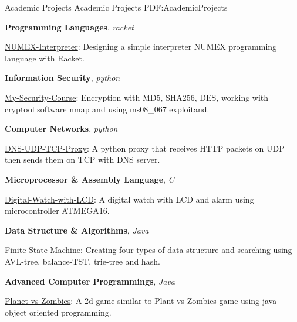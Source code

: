 \documentclass[letterpaper,MMMyyyy,nonstopmode]{resume}
\begin{document}
\begin{Body}


\Section
{Academic Projects}
{Academic Projects}
{PDF:AcademicProjects}

\BigGap
\BulletItem
\textbf{Programming Languages},
\textit{\small{racket}}
\begin{Detail}
\SubBulletItem
\href{https://github.com/aliyazdi75/NUMEX-Interpreter}
{NUMEX-Interpreter}:
Designing a simple interpreter
NUMEX programming language with Racket.
\end{Detail}

\BigGap
\BulletItem
\textbf{Information Security},
\textit{\small{python}}
\begin{Detail}
\SubBulletItem
\href{https://github.com/aliyazdi75/My-Security-Course}
{My-Security-Course}:
Encryption with MD5, SHA256, DES,
working with cryptool software nmap
and using ms08\_067 exploitand.
\end{Detail}

\BigGap
\BulletItem
\textbf{Computer Networks},
\textit{\small{python}}
\begin{Detail}
\SubBulletItem
\href{https://github.com/aliyazdi75/DNS-UDP-TCP-Proxy}
{DNS-UDP-TCP-Proxy}:
A python proxy that receives HTTP packets on UDP
then sends them on TCP with DNS server.
\end{Detail}


\BigGap
\BulletItem
\textbf{Microprocessor \& Assembly Language},
\textit{\small{C}}
\begin{Detail}
\SubBulletItem
\href{https://github.com/aliyazdi75/Digital-Watch-with-LCD}
{Digital-Watch-with-LCD}:
A digital watch with LCD and
alarm using microcontroller ATMEGA16.
\end{Detail}

\BigGap
\BulletItem
\textbf{Data Structure \& Algorithms},
\textit{\small{Java}}
\begin{Detail}
\SubBulletItem
\href{https://github.com/aliyazdi75/Finite-State-Machine}
{Finite-State-Machine}:
Creating four types of data structure and searching using
AVL-tree, balance-TST, trie-tree and hash.
\end{Detail}

\BigGap
\BulletItem
\textbf{Advanced Computer Programmings},
\textit{\small{Java}}
\begin{Detail}
\SubBulletItem
\href{https://github.com/aliyazdi75/Planet\_vs\_Zombies}
{Planet-vs-Zombies}:
A 2d game similar to Plant vs Zombies game
using java object oriented programming.
\end{Detail}


\end{Body}
\end{document}
